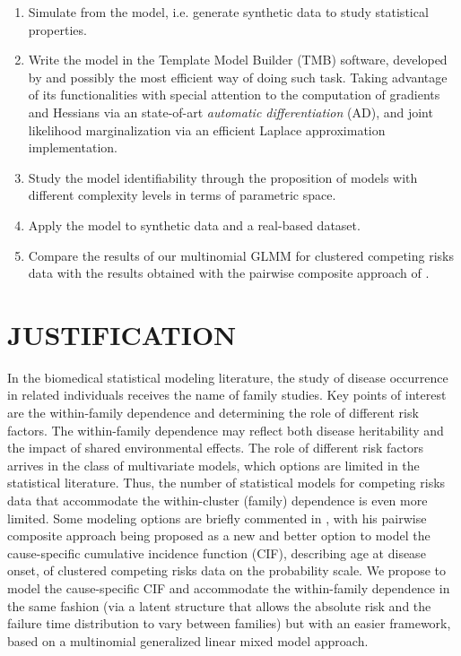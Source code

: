 \begin{enumerate}
\item Simulate from the model, i.e. generate synthetic data to study
  statistical properties.

\item Write the model in the Template Model Builder (TMB) software,
  developed by  and possibly the most efficient way of
  doing such task. Taking advantage of its functionalities with special
  attention to the computation of gradients and Hessians via an
  state-of-art \textit{automatic differentiation} (AD), and joint
  likelihood marginalization via an efficient Laplace approximation
  implementation.

\item Study the model identifiability through the proposition of models
  with different complexity levels in terms of parametric space.

\item Apply the model to synthetic data and a real-based dataset.

\item Compare the results of our multinomial GLMM for clustered
  competing risks data with the results obtained with the pairwise
  composite approach of .
\end{enumerate}

\section{JUSTIFICATION}

In the biomedical statistical modeling literature, the study of disease
occurrence in related individuals receives the name of family studies.
Key points of interest are the within-family dependence and determining
the role of different risk factors. The within-family dependence may
reflect both disease heritability and the impact of shared environmental
effects. The role of different risk factors arrives in the class of
multivariate models, which options are limited in the statistical
literature. Thus, the number of statistical models for competing risks
data that accommodate the within-cluster (family) dependence is even
more limited. Some modeling options are briefly commented in
, with his pairwise composite approach being
proposed as a new and better option to model the cause-specific
cumulative incidence function (CIF), describing age at disease onset, of
clustered competing risks data on the probability scale. We propose to
model the cause-specific CIF and accommodate the within-family
dependence in the same fashion (via a latent structure that allows the
absolute risk and the failure time distribution to vary between
families) but with an easier framework, based on a multinomial
generalized linear mixed model approach.

